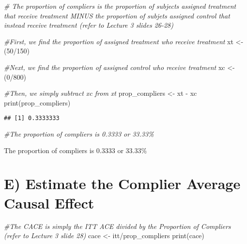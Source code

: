 \documentclass[
]{article}
\newenvironment{Shaded}{\begin{snugshade}}{\end{snugshade}}
\newcommand{\CommentTok}[1]{\textcolor[rgb]{0.56,0.35,0.01}{\textit{#1}}}
\newcommand{\DecValTok}[1]{\textcolor[rgb]{0.00,0.00,0.81}{#1}}
\newcommand{\FunctionTok}[1]{\textcolor[rgb]{0.00,0.00,0.00}{#1}}
\newcommand{\NormalTok}[1]{#1}
\newcommand{\OtherTok}[1]{\textcolor[rgb]{0.56,0.35,0.01}{#1}}
\newcommand{\SpecialCharTok}[1]{\textcolor[rgb]{0.00,0.00,0.00}{#1}}
\begin{document}
\begin{Shaded}
\begin{Highlighting}[]
\CommentTok{\# The proportion of compliers is the proportion of subjects assigned treatment that receive treatment MINUS the proportion of subjets assigned control that instead receive treatment (refer to Lecture 3 slides 26{-}28)}

\CommentTok{\#First, we find the proportion of assigned treatment who receive treatment }
\NormalTok{xt }\OtherTok{\textless{}{-}}\NormalTok{ (}\DecValTok{50}\SpecialCharTok{/}\DecValTok{150}\NormalTok{)}

\CommentTok{\#Next, we find the proportion of assigned control who receive treatment}
\NormalTok{xc }\OtherTok{\textless{}{-}}\NormalTok{ (}\DecValTok{0}\SpecialCharTok{/}\DecValTok{800}\NormalTok{)}

\CommentTok{\#Then, we simply subtract xc from xt}
\NormalTok{prop\_compliers }\OtherTok{\textless{}{-}}\NormalTok{ xt }\SpecialCharTok{{-}}\NormalTok{ xc}
\FunctionTok{print}\NormalTok{(prop\_compliers)}
\end{Highlighting}
\end{Shaded}

\begin{verbatim}
## [1] 0.3333333
\end{verbatim}

\begin{Shaded}
\begin{Highlighting}[]
\CommentTok{\#The proportion of compliers is 0.3333 or 33.33\%}
\end{Highlighting}
\end{Shaded}

The proportion of compliers is 0.3333 or 33.33\%

\hypertarget{e-estimate-the-complier-average-causal-effect}{%
\section{E) Estimate the Complier Average Causal
Effect}\label{e-estimate-the-complier-average-causal-effect}}

\begin{Shaded}
\begin{Highlighting}[]
\CommentTok{\#The CACE is simply the ITT ACE divided by the Proportion of Compliers (refer to Lecture 3 slide 28)}
\NormalTok{cace }\OtherTok{\textless{}{-}}\NormalTok{ itt}\SpecialCharTok{/}\NormalTok{prop\_compliers}
\FunctionTok{print}\NormalTok{(cace)}
\end{Highlighting}
\end{Shaded}
\end{document}
